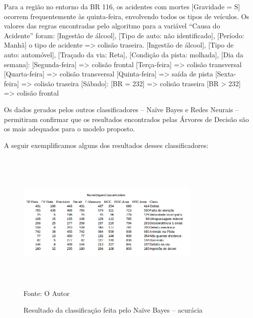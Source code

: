Para a região no entorno da BR 116, os acidentes com
mortes [Gravidade = S] ocorrem frequentemente às quinta-feira, envolvendo todos os tipos de veículos.
Os valores das regras encontradas pelo algoritmo para a
variável “Causa do Acidente” foram:
[Ingestão de álcool], [Tipo de auto: não identificado], [Período:
Manhã] o tipo de acidente => colisão traseira.
[Ingestão de álcool], [Tipo de auto: automóvel], [Traçado da
via: Reta], [Condição da pista: molhada], [Dia da semana]:
[Segunda-feira] => colisão frontal
[Terça-feira] => colisão transversal
[Quarta-feira] => colisão transversal
[Quinta-feira] => saída de pista
[Sexta-feira] => colisão traseira
[Sábado]: [BR = 232] => colisão traseira
	[BR > 232] => colisão frontal


\vspace{7mm}

Os dados gerados pelos outros classificadores -- Naïve Bayes e Redes Neurais -- permitiram confirmar que os resultados encontrados pelas Árvores de Decisão são os mais adequados para o modelo proposto.

A seguir exemplificamos alguns dos resultados desses classificadores:


\begin{figure}
	\centering
	\caption{Resultado da classificação feita pelo Naïve Bayes -- acurácia}
	\includegraphics[width=90mm, height=70mm]{Figuras/Resultados/NaiveBayesCausaAcident}\\
	\tiny Fonte: O Autor
	\label{fig:NaiveBayesCausaAcident}
\end{figure}


